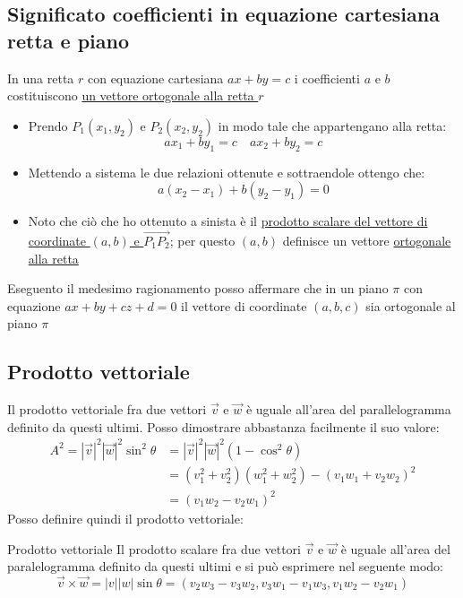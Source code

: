 \subsection{Significato coefficienti in equazione cartesiana retta e piano}
In una retta $r$ con equazione cartesiana $ax + by = c$ i coefficienti $a $ e $b$ costituiscono \underline{un vettore ortogonale alla retta $r$}
\begin{itemize}
	\item Prendo $P_1 \left( x_1,y_2 \right) $ e $P_2 \left( x_2,y_2 \right) $ in modo tale che appartengano alla retta:
	      \[
		      ax_1 + by_1 = c \quad ax_2+ by_2= c
	      \]
	\item Mettendo a sistema le due relazioni ottenute e sottraendole ottengo che:
	      \[
		      a\left( x_2-x_1 \right) + b\left( y_2-y_1 \right)  = 0
	      \]
	\item Noto che ciò che ho ottenuto a sinista è il \underline{prodotto scalare del vettore di coordinate  $\left( a,b \right) $ e $\vec{P_1P_2}$}; per questo $\left( a,b \right) $ definisce un vettore \underline{ortogonale alla retta}
\end{itemize}
Eseguento il medesimo ragionamento posso affermare che in un piano $\pi$ con equazione $ax + by + cz +d =0$ il vettore di coordinate $\left( a,b,c \right) $ sia ortogonale al piano $\pi$

\subsection{Prodotto vettoriale}
Il prodotto vettoriale fra due vettori $\vec{v}$ e $\vec{w}$ è uguale all'area del parallelogramma definito da questi ultimi. Posso dimostrare abbastanza facilmente il suo valore:
\begin{align*}
	A^2= \left|\vec{v}\right|^2\left|\vec{w}\right|^2 \sin ^2\theta & = \left|\vec{v}\right|^2\left|\vec{w}\right|^2 \left( 1- \cos^2 \theta   \right)                \\
	                                                                & = \left( v_1^2 + v_2^2 \right) \left( w_1^2 + w_2^2 \right) - \left( v_1w_1 + v_2w_2 \right) ^2 \\
	                                                                & = \left( v_{1}w_2- v_{2}w_1 \right) ^2
\end{align*}
Posso definire quindi il prodotto vettoriale:
\begin{definizione}{Prodotto vettoriale}
	Il prodotto scalare fra due vettori $\vec{v}$ e $\vec{w}$ è uguale all'area del paralelogramma definito da questi ultimi e si può esprimere nel seguente modo:
	\[
		\vec{v} \times \vec{w} = \left|v\right|\left|w\right| \sin \theta = \left( v_2w_3 - v_3w_2, v_3w_1-v_1w_3, v_1w_2-v_2w_1 \right)
	\]
\end{definizione}

